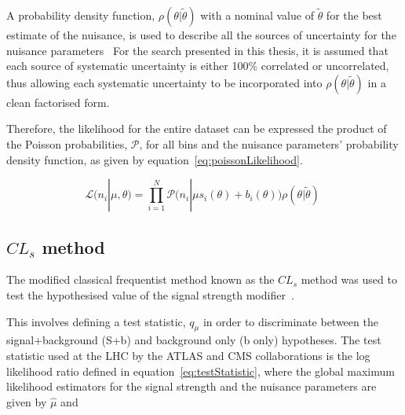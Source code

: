 A probability density function, $\rho ( \theta | \tilde{\theta} )$ with a nominal value of $\tilde{\theta}$ for the best estimate of the nuisance, is used to describe all the sources of uncertainty for the nuisance parameters~\cite{CMS-NOTE-2011-005}
For the search presented in this thesis, it is assumed that each source of systematic uncertainty is either 100\% correlated or uncorrelated, thus allowing each systematic uncertainty to be incorporated into $\rho ( \theta | \tilde{\theta} )$ in a clean factorised form.

Therefore, the likelihood for the entire dataset can be expressed the product of the Poisson probabilities, $\mathcal{P}$, for all bins and the nuisance parameters' probability density function, as given by equation~\ref{eq:poissonLikelihood}.

\begin{equation}
\mathcal{L} ( n_{i} | \mu , \theta ) = 
\prod_{i=1}^{N} \mathcal{P} \big( n_{i} | \mu s_{i} (\theta) + b_{i}(\theta) \big) \rho ( \theta | \tilde{\theta} ) \;
\label{eq:poissonLikelihood}
\end{equation}

\subsection{$CL_{s}$ method}
The modified classical frequentist method known as the $CL_{s}$ method was used to test the hypothesised value of the signal strength modifier~\cite{Cowan:2010js}.

This involves defining a test statistic, $q_{\mu}$ in order to discriminate between the signal+background (S+b) and background only (b only) hypotheses.
The test statistic used at the LHC by the ATLAS and CMS collaborations is the log likelihood ratio defined in equation~\ref{eq:testStatistic}, where the global maximum likelihood estimators for the signal strength and the nuisance parameters are given by $\hat{\mu}$ and 

